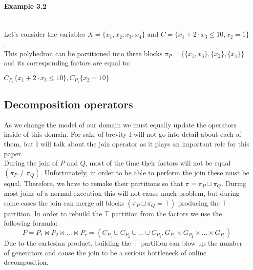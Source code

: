  
\paragraph{Example 3.2} \mbox{}\\
Let's consider the variables $X = \{x_1,x_2,x_3,x_4\}$ and $C = \{ x_1 + 2 \cdot x_3 \leq 10, x_2 = 1 \}$.\\
This polyhedron can be partitioned into three blocks $\pi_P = \{\{x_1,x_3\},\{x_2\},\{x_4\}\}$ and its corresponding factors are equal to:
\begin{center}
	$C_{P_1}\{x_1 + 2\cdot x_3 \leq 10 \} , C_{P_2}\{x_2 = 10 \}$
\end{center}


\subsection{Decomposition operators}
As we change the model of our domain we must equally update the operators inside of this domain. For sake of brevity I will not go into detail about each of them, but I will talk about the join operator as it plays an important role for this paper.\\
During the join of $P$ and $Q$, most of the time their factors will not be equal$(\pi_P \neq \pi_Q)$. Unfortunately, in order to be able to perform the join these must be equal. 
 Therefore, we have to remake their partitions so that $\pi = \pi_P\sqcup\pi_Q$. During most joins of a normal execution this will not cause much problem, but during some cases the join can merge all blocks $(\pi_P\sqcup\pi_Q = \top)$ producing the $\top$ partition. In order to rebuild the $\top$ partition from the factors we use the following formula:
\begin{equation}
	P = P_1 \Join P_2 \Join ... \Join P_r = (C_{P_1} \cup C_{P_2} \cup ... \cup C_{P_1}, G_{P_1} \times G_{P_2} \times  ... \times   G_{P_r})
\end{equation}
Due to the cartesian product, building the $\top$ partition can blow up the number of generators and cause the join to be a serious bottleneck of online decomposition.

